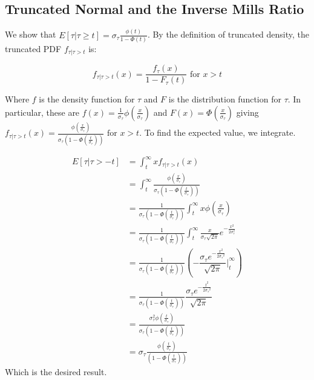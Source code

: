 \documentclass[12pt,twoside]{reedthesis}
\theoremstyle{definition}
\begin{document}
\subsection{Truncated Normal and the Inverse Mills Ratio}

We show that $E[\tau | \tau \geq t] = \sigma_\tau \frac{\phi(t)}{1 - \Phi(t)}$. By the definition of truncated density, the truncated PDF $f_{\tau | \tau > t}$ is:

$$f_{\tau | \tau > t}(x) = \frac{f_\tau(x)}{1 - F_\tau(t)} \text{  for } x > t$$

Where $f$ is the density function for $\tau$ and $F$ is the distribution function for $\tau$. In particular, these are $f(x) = \frac{1}{\sigma_\tau} \phi(\frac{x}{\sigma_\tau})$ and $F(x) = \Phi(\frac{x}{\sigma_\tau})$ giving $f_{\tau | \tau > t}(x) = \frac{\phi(\frac{x}{\sigma_\tau})}{\sigma_\tau(1 - \Phi(\frac{t}{\sigma_\tau}))} \text{  for } x > t$. To find the expected value, we integrate. 

\begin{align*}
E[\tau | \tau > - t] &= \int_t^\infty x f_{\tau | \tau > t}(x) \\
&= \int_t^\infty \frac{\phi(\frac{x}{\sigma_\tau})}{\sigma_\tau(1 - \Phi(\frac{t}{\sigma_\tau}))} \\
&= \frac{1}{\sigma_\tau(1 - \Phi(\frac{t}{\sigma_\tau}))} \int_t^\infty x \phi(\frac{x}{\sigma_\tau})  \\
&= \frac{1}{\sigma_\tau(1 - \Phi(\frac{t}{\sigma_\tau}))} \int_t^\infty  \frac{x}{\sigma_\tau \sqrt{2 \pi}}e^{-\frac{x^2}{2 \sigma_\tau^2}} \\
&= \frac{1}{\sigma_\tau(1 - \Phi(\frac{t}{\sigma_\tau}))} \left( -\dfrac{{\sigma_\tau}e^{-\frac{x^2}{2{\sigma_\tau}^2}}}{\sqrt{{2\pi}}} \bigg |_t^\infty \right) \\
&= \frac{1}{\sigma_\tau(1 - \Phi(\frac{t}{\sigma_\tau}))} \dfrac{{\sigma_\tau}e^{-\frac{t^2}{2{\sigma_\tau}^2}}}{\sqrt{{2\pi}}}  \\
&= \frac{\sigma_\tau^2 \phi(\frac{t}{\sigma_\tau})}{\sigma_\tau(1 - \Phi(\frac{t}{\sigma_\tau}))} \\
&= \sigma_\tau  \frac{\phi(\frac{t}{\sigma_\tau})}{(1 - \Phi(\frac{t}{\sigma_\tau}))} 
\end{align*}
Which is the desired result.


\end{document}
